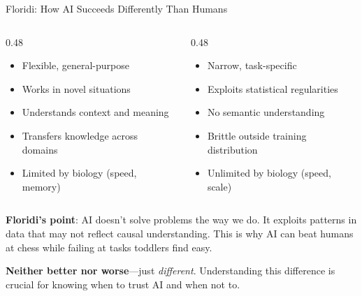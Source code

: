 \documentclass[aspectratio=169,11pt]{beamer}
\begin{document}
\begin{frame}{Floridi: How AI Succeeds Differently Than Humans}
\begin{columns}[T]
\begin{column}{0.48\textwidth}
\begin{probox}
\scriptsize
\begin{itemize}
    \item Flexible, general-purpose
    \item Works in novel situations
    \item Understands context and meaning
    \item Transfers knowledge across domains
    \item Limited by biology (speed, memory)
\end{itemize}
\end{probox}
\end{column}
\begin{column}{0.48\textwidth}
\begin{conceptbox}[AI Agency]
\scriptsize
\begin{itemize}
    \item Narrow, task-specific
    \item Exploits statistical regularities
    \item No semantic understanding
    \item Brittle outside training distribution
    \item Unlimited by biology (speed, scale)
\end{itemize}
\end{conceptbox}
\end{column}
\end{columns}

\vspace{0.3em}
\textbf{Floridi's point}: AI doesn't solve problems the way we do. It exploits patterns in data that may not reflect causal understanding. This is why AI can beat humans at chess while failing at tasks toddlers find easy.

\vspace{0.2em}
\textbf{Neither better nor worse}---just \emph{different}. Understanding this difference is crucial for knowing when to trust AI and when not to.
\end{frame}
\end{document}
